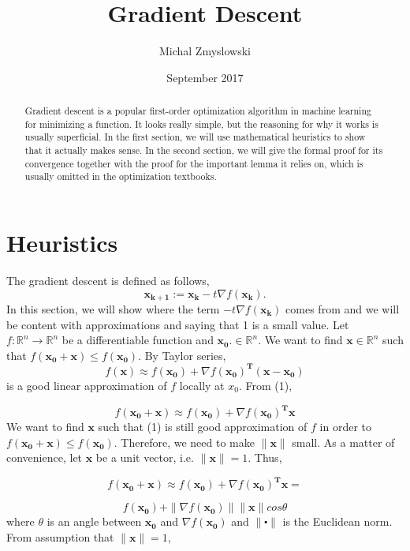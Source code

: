 \documentclass{article}
\title{Gradient Descent}
\author{Michal Zmyslowski}
\date{September 2017}
\begin{document}
\maketitle
\begin{abstract}
Gradient descent is a popular first-order optimization algorithm in machine learning for minimizing a function. It looks really simple, but the reasoning for why it works is usually superficial. In the first section, we will use mathematical heuristics to show that it actually makes sense. In the second section, we will give the formal proof for its convergence together with the proof for the important lemma it relies on, which is usually omitted in the optimization textbooks.
\end{abstract}
\section{Heuristics}
The gradient descent is defined as follows,
$$\mathbf{x_{k+1}}:=\mathbf{x_{k}}-t\nabla f(\mathbf{x_k}).$$
In this section, we will show where the term $-t\nabla f(\mathbf{x_k})$ comes from and we will be content with approximations and saying that 1 is a small value.
\bigskip
\newline
Let $f:\mathbb{R}^n \to \mathbb{R}^n$ be a differentiable function and $\mathbf{x_{0}}. \in \mathbb{R}^n$. We want to 
\newline
find $\mathbf{x} \in \mathbb{R}^n$ such that $f(\mathbf{x_{0}}+\mathbf{x}) \leq f(\mathbf{x_{0}})$. By Taylor series,
\begin{equation}
f(\mathbf{x}) \approx f(\mathbf{x_{0}})+ \nabla f(\mathbf{x_{0}})^{\mathbf{T}}(\mathbf{x}-\mathbf{x_{0}})
\end{equation}
\noindent
is a good linear approximation of $f$ locally at $x_{0}$. From (1),

$$f(\mathbf{x_{0}} + \mathbf{x}) \approx f(\mathbf{x_{0}}) + \nabla f(\mathbf{x_{0}})^{\mathbf{T}}\mathbf{x}$$
\noindent
We want to find $\mathbf{x}$ such that (1) is still good approximation of $f$ in order to $f(\mathbf{x_{0}}+\mathbf{x}) \leq f(\mathbf{x_{0}})$. Therefore, we need to make $\|\mathbf{x}\|$ small. As a matter of convenience, let $\mathbf{x}$ be a unit vector, i.e. $\|\mathbf{x}\|=1$. Thus,

$$f(\mathbf{x_{0}} + \mathbf{x}) \approx f(\mathbf{x_{0}}) + \nabla f(\mathbf{x_{0}})^{\mathbf{T}}\mathbf{x}=$$

$$f(\mathbf{x_{0}}) + \| \nabla f(\mathbf{x_{0}})\|\|\mathbf{x}\|cos\theta$$
\noindent
where $\theta$ is an angle between $\mathbf{x_0}$ and $\nabla f(\mathbf{x_0})$ and $\|\centerdot\|$ is the Euclidean norm. From assumption that $\|\mathbf{x}\|=1$,
\end{document}
